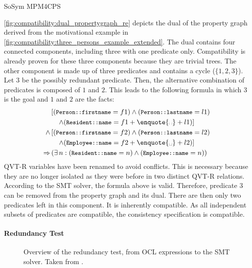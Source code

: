 \begin{copiedFrom}{SoSym MPM4CPS}
\begin{example}
\autoref{fig:compatibility:dual_propertygraph_re} depicts the dual of the property graph derived from the motivational example in \autoref{fig:compatibility:three_persons_example_extended}. The dual contains four connected components, including three with one predicate only. Compatibility is already proven for these three components because they are trivial trees. The other component is made up of three predicates and contains a cycle ($\{1, 2, 3\}$).
Let $3$ be the possibly redundant predicate. Then, the alternative combination of predicates is composed of $1$ and $2$. This leads to the following formula in which $3$ is the goal and $1$ and $2$ are the facts:
\begin{align*}
    &\left[(\propdisplay{\small Person::firstname} = f1) \wedge (\propdisplay{\small Person::lastname} = l1)\right.\\
    &\left.\formulaskip \wedge (\propdisplay{\small Resident::name} = f1 + \text{\enquote{\textvisiblespace}} + l1)\right]\\
    \wedge & \left[(\propdisplay{\small Person::firstname} = f2) \wedge (\propdisplay{\small Person::lastname} = l2)\right.\\
    &\left.\formulaskip \wedge (\propdisplay{\small Employee::name} = f2 + \text{\enquote{\textvisiblespace}} + l2)\right]\\
    \Rightarrow & \left(\exists n : (\propdisplay{\small Resident::name} = n) \wedge (\propdisplay{\small Employee::name} = n)\right)
\end{align*}
QVT-R variables have been renamed to avoid conflicts. This is necessary because they are no longer isolated as they were before in two distinct QVT-R relations. According to the SMT solver, the formula above is valid. Therefore, predicate $3$ can be removed from the property graph and its dual. There are then only two predicates left in this component. It is inherently compatible. As all independent subsets of predicates are compatible, the consistency specification is compatible.
\end{example}
    
\paragraph{Redundancy Test}

\begin{figure*}
    \centering
    \resizebox{\linewidth}{!}{}
    \caption[Redundancy test overview]{Overview of the redundancy test, from OCL expressions to the SMT solver. Taken from .}
    \label{fig:compatibility:redundancytest}
\end{figure*}


\end{copiedFrom}
